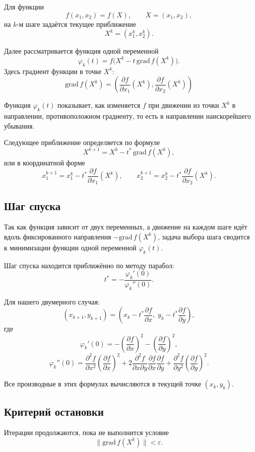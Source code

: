 Для функции
\[
f(x_1,x_2)=f(X), \qquad X=(x_1,x_2),
\]
на \(k\)-м шаге задаётся текущее приближение
\[
X^k=(x_1^k,x_2^k).
\]

Далее рассматривается функция одной переменной
\[
\varphi_k(t)=f\bigl(X^k-t\,\mathrm{grad}\,f(X^k)\bigr).
\]
Здесь градиент функции в точке \(X^k\):
\[
\mathrm{grad}\,f(X^k)=
\left(
\frac{\partial f}{\partial x_1}(X^k),
\frac{\partial f}{\partial x_2}(X^k)
\right)
\]

Функция \(\varphi_k(t)\) показывает, как изменяется \(f\) при движении из точки \(X^k\) в направлении, противоположном градиенту, то есть в направлении наискорейшего убывания.

Следующее приближение определяется по формуле
\[
X^{k+1}=X^k-t^*\,\mathrm{grad}\,f(X^k),
\]
или в координатной форме
\[
x_1^{k+1}=x_1^k-t^*\frac{\partial f}{\partial x_1}(X^k),
\qquad
x_2^{k+1}=x_2^k-t^*\frac{\partial f}{\partial x_2}(X^k).
\]

\subsection*{Шаг спуска}

Так как функция зависит от двух переменных, а движение на каждом шаге идёт вдоль фиксированного направления \(-\mathrm{grad}\,f(X^k)\), задача выбора шага сводится к минимизации функции одной переменной \(\varphi_k(t)\).

Шаг спуска находится приближённо по методу парабол:
\[
t^*=-\frac{\varphi_k'(0)}{\varphi_k''(0)}.
\]

Для нашего двумерного случая:
\[
(x_{k+1},y_{k+1})=
\left(
x_k-t^*\frac{\partial f}{\partial x},
\;
y_k-t^*\frac{\partial f}{\partial y}
\right),
\]
где
\[
\varphi_k'(0)=-
\left(\frac{\partial f}{\partial x}\right)^2-
\left(\frac{\partial f}{\partial y}\right)^2,
\]
\[
\varphi_k''(0)=
\frac{\partial^2 f}{\partial x^2}\left(\frac{\partial f}{\partial x}\right)^2
+
2\frac{\partial^2 f}{\partial x\partial y}
\frac{\partial f}{\partial x}
\frac{\partial f}{\partial y}
+
\frac{\partial^2 f}{\partial y^2}\left(\frac{\partial f}{\partial y}\right)^2.
\]

Все производные в этих формулах вычисляются в текущей точке \((x_k,y_k)\).

\subsection*{Критерий остановки}

Итерации продолжаются, пока не выполнится условие
\[
\|\mathrm{grad}\,f(X^k)\|<\varepsilon.
\]

